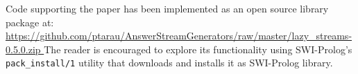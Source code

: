 \documentclass{new_tlp}
\begin{document}
Code supporting the paper has been implemented as an open source library package at:\\
{\small \url{https://github.com/ptarau/AnswerStreamGenerators/raw/master/lazy_streams-0.5.0.zip } }
The reader is encouraged to explore its functionality using SWI-Prolog's {\tt pack\_install/1} utility that downloads and installs it as SWI-Prolog library.



\end{document}
